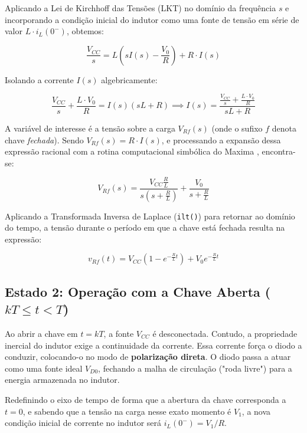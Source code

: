 Aplicando a Lei de Kirchhoff das Tensões (LKT) no domínio da frequência $s$ e incorporando a condição inicial do indutor como uma fonte de tensão em série de valor $L \cdot i_L(0^-)$, obtemos:

\begin{equation}
	\frac{V_{CC}}{s} = L \left( sI(s) - \frac{V_0}{R} \right) + R \cdot I(s)
\end{equation}

Isolando a corrente $I(s)$ algebricamente:

\begin{equation}
	\frac{V_{CC}}{s} + \frac{L \cdot V_0}{R} = I(s) (sL + R) \implies I(s) = \frac{\frac{V_{CC}}{s} + \frac{L \cdot V_0}{R}}{sL + R}
\end{equation}

A variável de interesse é a tensão sobre a carga $V_{Rf}(s)$ (onde o sufixo $f$ denota chave \textit{fechada}). Sendo $V_{Rf}(s) = R \cdot I(s)$, e processando a expansão dessa expressão racional com a rotina computacional simbólica do Maxima \cite{maxima}, encontra-se:

\begin{equation}
	V_{Rf}(s) = \frac{V_{CC} \frac{R}{L}}{s \left(s + \frac{R}{L}\right)} + \frac{V_0}{s + \frac{R}{L}}
\end{equation}

Aplicando a Transformada Inversa de Laplace (\texttt{ilt()}) para retornar ao domínio do tempo, a tensão durante o período em que a chave está fechada resulta na expressão:

\begin{equation}
	v_{Rf}(t) = V_{CC} \left(1 - e^{-\frac{R}{L}t}\right) + V_0 e^{-\frac{R}{L}t}
\end{equation}

\subsection{Estado 2: Operação com a Chave Aberta ($kT \le t < T$)}

Ao abrir a chave em $t = kT$, a fonte $V_{CC}$ é desconectada. Contudo, a propriedade inercial do indutor exige a continuidade da corrente. Essa corrente força o diodo a conduzir, colocando-o no modo de \textbf{polarização direta}. O diodo passa a atuar como uma fonte ideal $V_{D0}$, fechando a malha de circulação ("roda livre") para a energia armazenada no indutor. 

Redefinindo o eixo de tempo de forma que a abertura da chave corresponda a $t = 0$, e sabendo que a tensão na carga nesse exato momento é $V_1$, a nova condição inicial de corrente no indutor será $i_L(0^-) = V_1 / R$.

